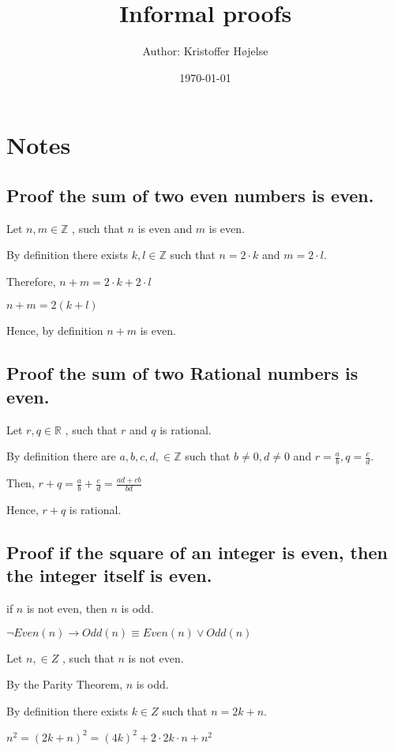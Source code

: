 \documentclass[a4paper,11pt]{article}
\title{Informal proofs}
\author{Author: Kristoffer Højelse} %
\date{\today}
\begin{document}
 

\maketitle

\section{Notes}

\subsection{Proof the sum of two even numbers is even.}

Let $n, m \in \mathbb{Z}$ , such that  $n$ is even and $m$ is even.

By definition there exists $k, l \in \mathbb{Z}$ such that $n= 2 \cdot k$ and $m = 2 \cdot l$.

Therefore, $n+m = 2 \cdot k + 2 \cdot l$

$n+m = 2(k + l)$

Hence, by definition $n+m$ is even.

\subsection{Proof the sum of two Rational numbers is even.}

Let $r, q \in \mathbb{R}$ , such that  $r$ and $q$ is rational.

By definition there are $a,b,c,d, \in \mathbb{Z}$ such that $b \neq 0, d \neq 0$ and $r = \frac{a}{b}, q = \frac{c}{d}$.

Then, $r+q = \frac{a}{b} + \frac{c}{d} = \frac{ad + cb}{bd}$

Hence, $r+q$ is rational.

\subsection{Proof if the square of an integer is even, then the integer itself is even.}
if $n$ is not even, then $n$ is odd.

$ \neg Even(n) \to Odd(n) \equiv Even(n) \lor Odd(n) $


Let $n, \in Z$ , such that $n$ is not even.

By the Parity Theorem, $n$ is odd.  

By definition there exists $k \in Z$ such that $n = 2k+n$.

$n^2 = (2k+n)^2 = (4k)^2 + 2 \cdot 2k \cdot n + n^2$
\end{document}
